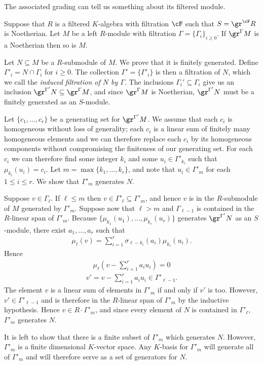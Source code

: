 The associated grading can tell us something about its filtered module.
\begin{thm}\label{thm:noeth-assoc-graded-module}
	Suppose that $R$ is a filtered $K$-algebra with filtration $\cF$ such that $S = \gr^\cF R$ is Noetherian. Let $M$ be a left $R$-module with filtration $\Gamma = \{\Gamma_i\}_{i\geq 0}$. If $\gr^\Gamma M$ is a Noetherian then so is $M$.
\end{thm}
\begin{prf}
	Let $N \subseteq M$ be a $R$-submodule of $M$. We prove that it is finitely generated. Define $\Gamma'_i = N \cap \Gamma_i$ for $i \geq 0$. The collection $\Gamma' = \{\Gamma'_i\}$ is then a filtration of $N$, which we call the \emph{induced filtration of $N$ by $\Gamma$}. The inclusions $\Gamma_i' \subseteq \Gamma_i$ give us an inclusion $\gr^{\Gamma'} N \subseteq \gr^\Gamma M$, and since $\gr^\Gamma M$ is Noetherian, $\gr^{\Gamma'}N$ must be a finitely generated as an $S$-module.

	Let $\{c_1,...,c_r\}$ be a generating set for $\gr^{\Gamma'}M$. We assume that each $c_i$ is homogeneous without loss of generality; each $c_i$ is a linear sum of finitely many homogeneous elements and we can therefore replace each $c_i$ by its homogeneous components without compromising the finiteness of our generating set. For each $c_i$ we can therefore find some integer $k_i$ and some $u_i \in \Gamma'_{k_i}$ such that $\mu_{k_i}(u_i) = c_i$. Let $m = \max\{k_1,...,k_r\}$, and note that $u_i \in \Gamma'_m$ for each $1\leq i\leq r$. We show that $\Gamma'_m$ generates $N$.

    Suppose $v \in \Gamma_\ell$. If $\ell \leq m$ then $v \in \Gamma'_\ell \subseteq \Gamma'_m$, and hence $v$ is in the $R$-submodule of $M$ generated by $\Gamma'_m$. Suppose now that $\ell > m$ and $\Gamma_{\ell - 1}$ is contained in the $R$-linear span of $\Gamma'_m$. Because $\{\mu_{k_1}(u_1),...,\mu_{k_r}(u_r)\}$ generates $\gr^{\Gamma'}N$ as an $S$-module, there exist $a_1,...,a_r$ such that
	\begin{align*}
		\mu_\ell(v) = \sum_{i=1}^r \sigma_{\ell-k_i}(a_i)\mu_{k_i}(u_i).
	\end{align*}
	Hence
	\begin{align*}
		\mu_\ell \left(v - \sum_{i=1}^r a_i u_i\right) = 0
	\end{align*}
	\begin{align*}
		v' = v - \sum_{i=1}^r a_i u_i \in \Gamma'_{\ell - 1}.
	\end{align*}
	The element $v$ is a linear sum of elements in $\Gamma'_m$ if and only if $v'$ is too. However, $v' \in \Gamma'_{\ell - 1}$ and is therefore in the $R$-linear span of $\Gamma'_{m}$ by the inductive hypothesis. Hence $v \in R\cdot \Gamma'_m$, and since every element of $N$ is contained in $\Gamma'_\ell$, $\Gamma'_m$ generates $N$.

	It is left to show that there is a finite subset of $\Gamma'_m$ which generates $N$. However, $\Gamma'_m$ is a finite dimensional $K$-vector space. Any $K$-basis for $\Gamma'_m$ will generate all of $\Gamma'_m$ and will therefore serve as a set of generators for $N$.
\end{prf}

